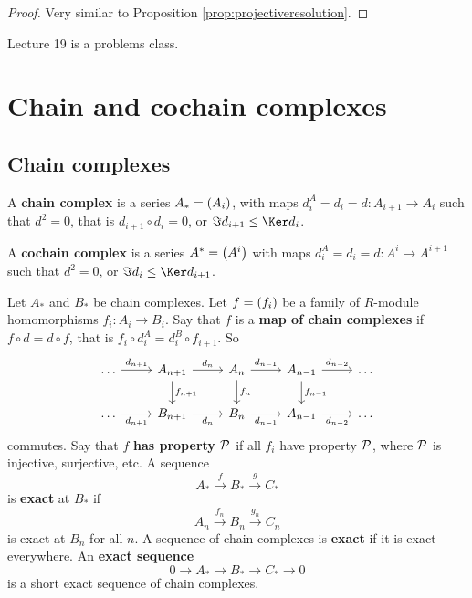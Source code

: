 \begin{proof}
Very similar to Proposition \ref{prop:projectiveresolution}.
\end{proof}


Lecture 19 is a problems class.

\pagebreak

\section{Chain and cochain complexes}

\subsection{Chain complexes}


\begin{definition}
A \textbf{chain complex} is a series $ A_* = \br{A_i} $, with maps $ d_i^A = d_i = d : A_{i + 1} \to A_i $ such that $ d^2 = 0 $, that is $ d_{i + 1} \circ d_i = 0 $, or $ \Im d_{i + 1} \le \Ker d_i $.
\end{definition}

\begin{definition}
A \textbf{cochain complex} is a series $ A^* = \br{A^i} $ with maps $ d_i^A = d_i = d : A^i \to A^{i + 1} $ such that $ d^2 = 0 $, or $ \Im d_i \le \Ker d_{i + 1} $.
\end{definition}

Let $ A_* $ and $ B_* $ be chain complexes. Let $ f = \br{f_i} $ be a family of $ R $-module homomorphisms $ f_i : A_i \to B_i $. Say that $ f $ is a \textbf{map of chain complexes} if $ f \circ d = d \circ f $, that is $ f_i \circ d_i^A = d_i^B \circ f_{i + 1} $. So
$$
\begin{tikzcd}
\dots \arrow{r}{d_{n + 1}} & A_{n + 1} \arrow{r}{d_n} \arrow{d}{f_{n + 1}} & A_n \arrow{r}{d_{n - 1}} \arrow{d}{f_n} & A_{n - 1} \arrow{r}{d_{n - 2}} \arrow{d}{f_{n - 1}} & \dots \\
\dots \arrow[swap]{r}{d_{n + 1}} & B_{n + 1} \arrow[swap]{r}{d_n} & B_n \arrow[swap]{r}{d_{n - 1}} & A_{n - 1} \arrow[swap]{r}{d_{n - 2}} & \dots
\end{tikzcd}
$$
commutes. Say that $ f $ \textbf{has property $ \mathcal{P} $} if all $ f_i $ have property $ \mathcal{P} $, where $ \mathcal{P} $ is injective, surjective, etc. A sequence
$$ A_* \xrightarrow{f} B_* \xrightarrow{g} C_* $$
is \textbf{exact} at $ B_* $ if
$$ A_n \xrightarrow{f_n} B_n \xrightarrow{g_n} C_n $$
is exact at $ B_n $ for all $ n $. A sequence of chain complexes is \textbf{exact} if it is exact everywhere. An \textbf{exact sequence}
$$ 0 \to A_* \to B_* \to C_* \to 0 $$
is a short exact sequence of chain complexes.

